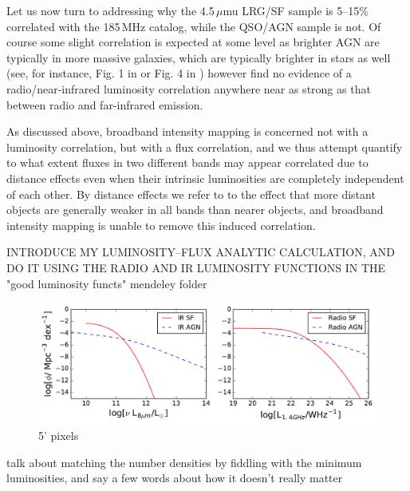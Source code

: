 \documentclass[preprint]{aastex}
\begin{document}
Let us now turn to addressing why the 4.5\,$\mu$mu LRG/SF sample is 5--15\% correlated with the 185\,MHz catalog, while the QSO/AGN sample is not. Of course some slight correlation is expected at some level as brighter AGN are typically in more massive galaxies, which are typically brighter in stars as well (see, for instance, Fig. 1 in \citep{seymour07} or Fig. 4 in \citep{Willott03}) however \citet{mauch07} find no evidence of a radio/near-infrared luminosity correlation anywhere near as strong as that between radio and far-infrared emission. 

As discussed above, broadband intensity mapping is concerned not with a luminosity correlation, but with a flux correlation, and we thus attempt quantify to what extent fluxes in two different bands may appear correlated due to distance effects even when their intrinsic luminosities are completely independent of each other. By distance effects we refer to to the effect that more distant objects are generally weaker in all bands than nearer objects, and broadband intensity mapping is unable to remove this induced correlation.

INTRODUCE MY LUMINOSITY--FLUX ANALYTIC CALCULATION, AND DO IT USING THE RADIO AND IR LUMINOSITY FUNCTIONS IN THE "good luminosity functs" mendeley folder

\citet{mauch07}
\citet{fu10}


\begin{figure}[h]
\centering
\includegraphics[width=6in]{images/sim_rad_ir_luminosity_functions.pdf}
\caption{5' pixels}
\label{fig:luminosityfunctions}
\end{figure}
talk about matching the number densities by fiddling with the minimum luminosities, and say a few words about how it doesn't really matter
\end{document}
